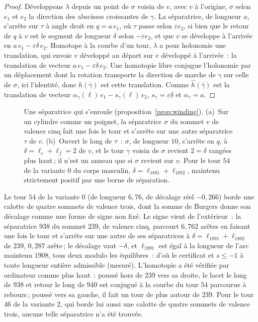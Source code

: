 \documentclass[11pt,a4paper]{article}
\newcommand{\shift}{s}
\begin{document}
\begin{proof}
Développons $\lambda$ depuis un point de $\sigma$ voisin de $v$, avec $v$ à
l'origine, $\sigma$ selon $e_1$ et $e_2$ la direction des abscisses
croissantes de $\gamma$. La séparatrice, de longueur $a$, s'arrête sur $\tau$
à angle droit en $q = a\,e_1$, où $\tau$ passe selon $\varepsilon e_2$, si
bien que le retour de $q$ à $v$ est le segment de longueur $\delta$ selon
$-\varepsilon e_2$, et que $v$ se développe à l'arrivée en $a\,e_1 -
\varepsilon\delta\,e_2$. Homotope à la courbe d'un tour, $\lambda$ a pour
holonomie une translation, qui envoie $v$ développé au départ sur $v$
développé à l'arrivée~: la translation de vecteur $a\,e_1 -
\varepsilon\delta\,e_2$. Une homotopie libre conjugue l'holonomie par un
déplacement dont la rotation transporte la direction de marche de $\gamma$ sur
celle de $\sigma$, ici l'identité, donc $\hat h(\bar\gamma)$ est cette
translation. Comme $\hat h(\bar\gamma)$ est la translation de vecteur
$\alpha_\gamma(\ell)\,e_1 - \shift_\gamma(\ell)\,e_2$, $\shift_\gamma =
\varepsilon\delta$ et $\alpha_\gamma = a$.
\end{proof}

\begin{figure}[t]
\centering

\caption{Une séparatrice qui s'enroule (proposition~\ref{prop:winding}).
(a)~Sur un cylindre comme un poignet, la séparatrice $\sigma$ du sommet $v$ de
valence cinq fait une fois le tour et s'arrête sur une autre séparatrice
$\tau$ de $v$. (b)~Ouvert le long de $\tau$~: $\sigma$, de longueur $10$,
s'arrête en $q$, à $\delta = \ell_e + \ell_f = 2$ de $v$, et le tour $\gamma$
voisin de $\sigma$ revient $2 = \delta$ rangées plus haut\,; il n'est un
anneau que si $\sigma$ revient sur $v$. Pour le tour $54$ de la variante 0
du corps masculin, $\delta = \ell_{1891} + \ell_{1892}$, maintenu strictement
positif par une borne de séparation.}
\label{fig:separatrix}
\end{figure}

Le tour $54$ de la variante 0 (de longueur $6,76$, de décalage réel
$-0,266$) borde une calotte de quatre sommets de valence trois, dont la
somme de Burgers donne son décalage comme une forme de signe non fixé. Le
signe vient de l'extérieur~: la séparatrice $938$ du sommet $239$, de valence
cinq, parcourt $6,762$ arêtes en faisant une fois le tour et s'arrête sur une
autre de ses séparatrices à $\delta = \ell_{1891} + \ell_{1892}$ de $239$,
$0,287$ arête\,; le décalage vaut $-\delta$, et $\ell_{1891}$ est égal à la
longueur de l'arc maintenu $1908$, tous deux modulo les équilibres~: d'où le
certificat et $\shift \le -1$ à toute longueur entière admissible (mesuré).
L'homotopie a été vérifiée par ordinateur comme plus haut~: poussé hors de
$239$ vers sa droite, le lacet le long de $938$ et retour le long de $940$ est
conjugué à la courbe du tour $54$ parcourue à rebours\,; poussé vers sa
gauche, il fait un tour de plus autour de $239$. Pour le tour $46$ de la
variante 2, qui borde lui aussi une calotte de quatre sommets de valence
trois, aucune telle séparatrice n'a été trouvée.
\end{document}
